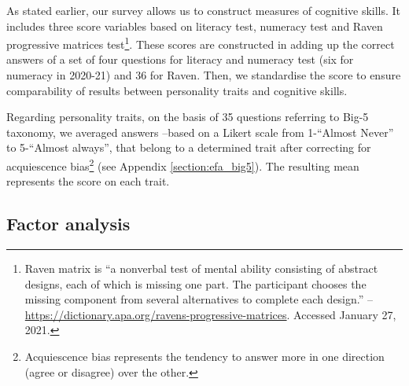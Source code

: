 \documentclass[a4paper, 12pt, onecolumn]{article}
\begin{document}
As stated earlier, our survey allows us to construct measures of cognitive skills.
It includes three score variables based on literacy test, numeracy test and Raven progressive matrices test\footnote{Raven matrix is ``a nonverbal test of mental ability consisting of abstract designs, each of which is missing one part. The participant chooses the missing component from several alternatives to complete each design.'' -- \url{https://dictionary.apa.org/ravens-progressive-matrices}. Accessed January 27, 2021.}.
These scores are constructed in adding up the correct answers of a set of four questions for literacy and numeracy test (six for numeracy in 2020-21) and 36 for Raven.
Then, we standardise the score to ensure comparability of results between personality traits and cognitive skills.

Regarding personality traits, on the basis of 35 questions referring to Big-5 taxonomy, we averaged answers --based on a Likert scale from 1-``Almost Never'' to 5-``Almost always'', that belong to a determined trait after correcting for acquiescence bias\footnote{Acquiescence bias represents the tendency to answer more in one direction (agree or disagree) over the other.} (see Appendix \ref{section:efa_big5}).
The resulting mean represents the score on each trait.



	\subsection{Factor analysis}
\end{document}
